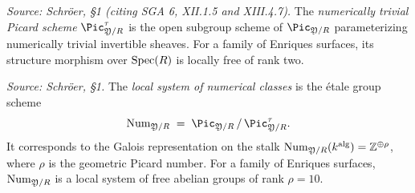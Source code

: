 \begin{definition}
  \label{def:pic-tau}
  \textit{Source: Schr\"oer, §1 (citing SGA 6, XII.1.5 and XIII.4.7).}
  The \emph{numerically trivial Picard scheme} \(\Pic^{\tau}_{\foY/R}\) is the open subgroup scheme of
  \(\Pic_{\foY/R}\) parameterizing numerically trivial invertible sheaves.
  For a family of Enriques surfaces, its structure morphism over \(\mathrm{Spec}(R)\) is locally free of rank two.
\end{definition}

\begin{definition}
  \label{def:num-local-system}
  \textit{Source: Schr\"oer, §1.}
  The \emph{local system of numerical classes} is the \'etale group scheme
  \[
    \Num_{\foY/R} \;=\; \Pic_{\foY/R} \,/\, \Pic^{\tau}_{\foY/R}.
  \]
  It corresponds to the Galois representation on the stalk
  \(\mathrm{Num}_{\mathfrak{Y}/R}(k^{\mathrm{alg}}) = \mathbb{Z}^{\oplus \rho}\), where \(\rho\) is the geometric Picard number.
  For a family of Enriques surfaces, \(\mathrm{Num}_{\mathfrak{Y}/R}\) is a local system of free abelian groups of rank \(\rho = 10\).
\end{definition}


